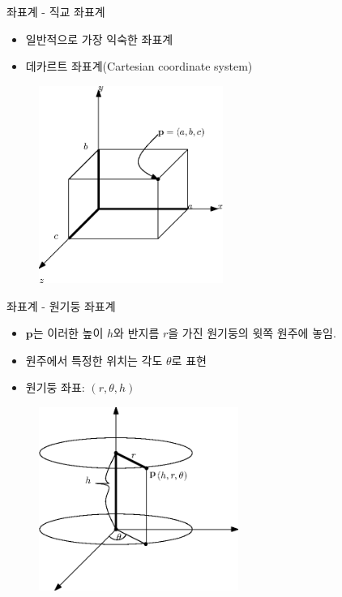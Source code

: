 \documentclass{beamer}
\begin{document}
\begin{frame}{좌표계 - 직교 좌표계}

\begin{itemize}
\item 일반적으로 가장 익숙한 좌표계
\item 데카르트 좌표계(Cartesian coordinate system)
\end{itemize}

\begin{figure}
    \includegraphics[width=6cm]{Math_transform/CartesianCoord.eps}
\end{figure}

\end{frame}

\begin{frame}{좌표계 - 원기둥 좌표계}

\begin{itemize}
\item $\mathbf p$는 이러한 높이 $h$와 반지름 $r$을 가진 원기둥의 윗쪽 원주에 놓임.
\item 원주에서 특정한 위치는 각도 $\theta$로 표현
\item 원기둥 좌표: $(r, \theta, h)$
\end{itemize}

\begin{figure}
    \includegraphics[width=6.5cm]{Math_transform/cylindricCoord.eps}
\end{figure}

\end{frame}
\end{document}
